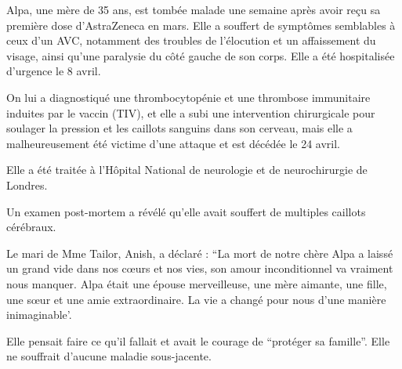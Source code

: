 Alpa, une mère de 35 ans, est tombée malade une semaine après avoir reçu sa
première dose d'AstraZeneca en mars. Elle a souffert de symptômes semblables à
ceux d'un AVC, notamment des troubles de l'élocution et un affaissement du
visage, ainsi qu'une paralysie du côté gauche de son corps. Elle a été
hospitalisée d'urgence le 8 avril.

On lui a diagnostiqué une thrombocytopénie et une thrombose immunitaire induites
par le vaccin (TIV), et elle a subi une intervention chirurgicale pour soulager
la pression et les caillots sanguins dans son cerveau, mais elle a
malheureusement été victime d'une attaque et est décédée le 24 avril.

Elle a été traitée à l'Hôpital National de neurologie et de neurochirurgie de
Londres.

Un examen post-mortem a révélé qu'elle avait souffert de multiples caillots
cérébraux.

Le mari de Mme Tailor, Anish, a déclaré : “La mort de notre chère Alpa a laissé
un grand vide dans nos cœurs et nos vies, son amour inconditionnel va vraiment
nous manquer. Alpa était une épouse merveilleuse, une mère aimante, une fille,
une sœur et une amie extraordinaire. La vie a changé pour nous d'une manière
inimaginable'.

Elle pensait faire ce qu'il fallait et avait le courage de “protéger sa
famille”. Elle ne souffrait d'aucune maladie sous-jacente.


